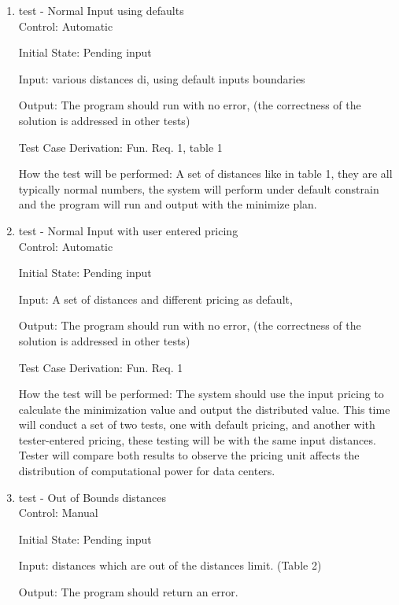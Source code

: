 \documentclass[12pt, titlepage]{article}
\begin{document}
\begin{enumerate}

\item{test - Normal Input using defaults}\\

Control: Automatic
					
Initial State: Pending input
					
Input: various distances di, using default inputs boundaries 
					
Output: The program should run with no error, (the correctness of the solution is addressed in other tests)

Test Case Derivation: Fun. Req. 1, table 1
					
How the test will be performed: A set of distances like in table 1, they are all typically normal numbers, the system will perform under default constrain and the program will run and output with the minimize plan. 

\item{test - Normal Input with user entered pricing}\\

Control: Automatic
					
Initial State: Pending input
					
Input: A set of distances and different pricing as default,
					
Output: The program should run with no error, (the correctness of the solution is addressed in other tests)

Test Case Derivation: Fun. Req. 1
					
How the test will be performed: The system should use the input pricing to calculate the minimization value and output the distributed value. This time will conduct a set of two tests, one with default pricing, and another with tester-entered pricing, these testing will be with the same input distances. Tester will compare both results to observe the pricing unit affects the distribution of computational power for data centers.

\item{test - Out of Bounds distances} \\

Control: Manual
					
Initial State: Pending input
					
Input: distances which are out of the distances limit. (Table 2)
					
Output: The program should return an error. 


\end{enumerate}
\end{document}
